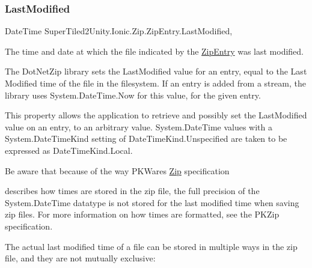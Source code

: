 \subsubsection{\texorpdfstring{Last\+Modified}{LastModified}}
{\footnotesize\ttfamily Date\+Time Super\+Tiled2\+Unity.\+Ionic.\+Zip.\+Zip\+Entry.\+Last\+Modified\hspace{0.3cm}{\ttfamily [get]}, {\ttfamily [set]}}



The time and date at which the file indicated by the {\ttfamily \mbox{\hyperlink{class_super_tiled2_unity_1_1_ionic_1_1_zip_1_1_zip_entry}{Zip\+Entry}}} was last modified. 

The Dot\+Net\+Zip library sets the Last\+Modified value for an entry, equal to the Last Modified time of the file in the filesystem. If an entry is added from a stream, the library uses {\ttfamily System.\+Date\+Time.\+Now} for this value, for the given entry. 

This property allows the application to retrieve and possibly set the Last\+Modified value on an entry, to an arbitrary value. System.\+Date\+Time values with a System.\+Date\+Time\+Kind setting of {\ttfamily Date\+Time\+Kind.\+Unspecified} are taken to be expressed as {\ttfamily Date\+Time\+Kind.\+Local}. 

Be aware that because of the way P\+K\+Ware\textquotesingle{}s \mbox{\hyperlink{namespace_super_tiled2_unity_1_1_ionic_1_1_zip}{Zip}} specification

describes how times are stored in the zip file, the full precision of the {\ttfamily System.\+Date\+Time} datatype is not stored for the last modified time when saving zip files. For more information on how times are formatted, see the P\+K\+Zip specification. 

The actual last modified time of a file can be stored in multiple ways in the zip file, and they are not mutually exclusive\+: 


